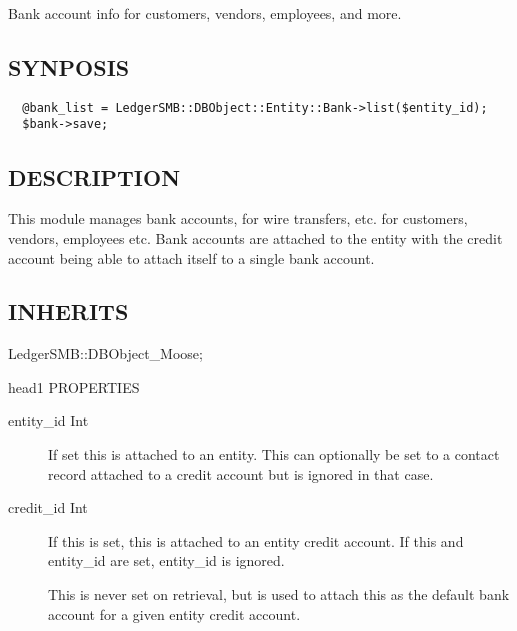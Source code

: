 \begin{description}
\begin{description}
\begin{description}
\begin{description}
\begin{description}
\begin{description}
\begin{description}
\begin{description}
Bank account info for customers, vendors, 
employees, and more.

\subsection*{SYNPOSIS\label{LedgerSMB::DBObject::Entity::Bank_SYNPOSIS}}
\begin{verbatim}
  @bank_list = LedgerSMB::DBObject::Entity::Bank->list($entity_id);
  $bank->save;
\end{verbatim}
\subsection*{DESCRIPTION\label{LedgerSMB::DBObject::Entity::Bank_DESCRIPTION}}


This module manages bank accounts, for wire transfers, etc. for customers,
vendors, employees etc.   Bank accounts are attached to the entity with the
credit account being able to attach itself to a single bank account.

\subsection*{INHERITS\label{LedgerSMB::DBObject::Entity::Bank_INHERITS}}
\begin{description}

\item[{LedgerSMB::DBObject\_Moose;}] \mbox{}\end{description}


head1 PROPERTIES

\begin{description}

\item[{entity\_id Int}] \mbox{}

If set this is attached to an entity.  This can optionally be set to a contact
record attached to a credit account but is ignored in that case.


\item[{credit\_id Int}] \mbox{}

If this is set, this is attached to an entity credit account.  If this and
entity\_id are set, entity\_id is ignored.



This is never set on retrieval, but is used to attach this as the default bank
account for a given entity credit account.



\end{description}
\end{description}
\end{description}
\end{description}
\end{description}
\end{description}
\end{description}
\end{description}
\end{description}
